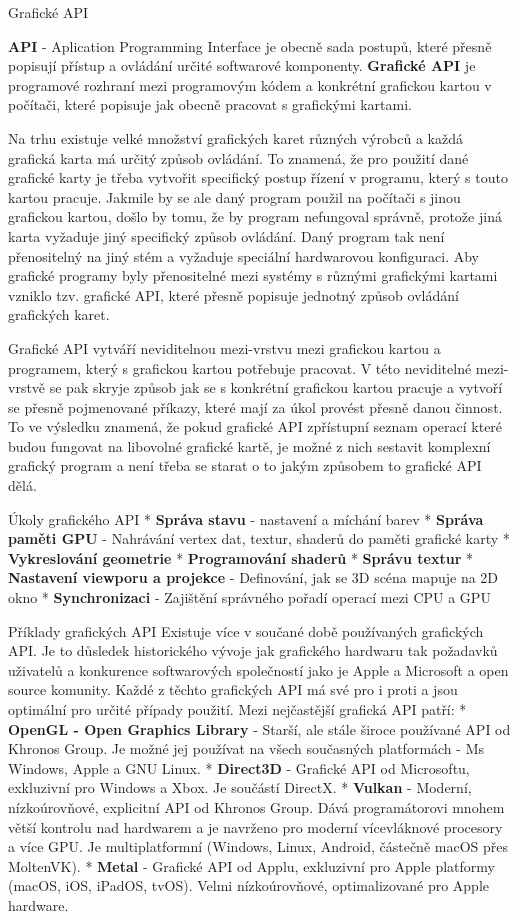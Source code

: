 \chap Grafické API

{\bf API} - Aplication Programming Interface je obecně sada postupů, které přesně popisují přístup a ovládání určité softwarové komponenty. {\bf Grafické API} je programové rozhraní mezi programovým kódem a konkrétní grafickou kartou v počítači, které popisuje jak obecně pracovat s grafickými kartami. 

Na trhu existuje velké množství grafických karet různých výrobců a každá grafická karta má určitý způsob ovládání. To znamená, že pro použití dané grafické karty je třeba vytvořit specifický postup řízení v programu, který s touto kartou pracuje. Jakmile by se ale daný program použil na počítači s jinou grafickou kartou, došlo by tomu, že by program nefungoval správně, protože jiná karta vyžaduje jiný specifický způsob ovládání. Daný program tak není přenositelný na jiný stém a vyžaduje speciální hardwarovou konfiguraci. Aby grafické programy byly přenositelné mezi systémy s různými grafickými kartami vzniklo tzv. grafické API, které přesně popisuje jednotný způsob ovládání grafických karet. 

Grafické API vytváří neviditelnou mezi-vrstvu mezi grafickou kartou a programem, který s grafickou kartou potřebuje pracovat. V této neviditelné mezi-vrstvě se pak skryje způsob jak se s konkrétní grafickou kartou pracuje a vytvoří se přesně pojmenované příkazy, které mají za úkol provést přesně danou činnost. To ve výsledku znamená, že pokud grafické API zpřístupní seznam operací které budou fungovat na libovolné grafické kartě, je možné z nich sestavit komplexní grafický program a není třeba se starat o to jakým způsobem to grafické API dělá.

\sec Úkoly grafického API
\begitems
* {\bf Správa stavu} - nastavení a míchání barev
* {\bf Správa paměti GPU} - Nahrávání vertex dat, textur, shaderů do paměti grafické karty
* {\bf Vykreslování geometrie}
* {\bf Programování shaderů} 
* {\bf Správu textur}
* {\bf Nastavení viewporu a projekce} - Definování, jak se 3D scéna mapuje na 2D okno
* {\bf Synchronizaci} - Zajištění správného pořadí operací mezi CPU a GPU
\enditems


\sec Příklady grafických API
Existuje více v součané době používaných grafických API. Je to důsledek historického vývoje jak grafického hardwaru tak požadavků uživatelů a konkurence softwarových společností jako je Apple a Microsoft a open source komunity. Každé z těchto grafických API má své pro i proti a jsou optimální pro určité případy použití. Mezi nejčastější grafická API patří:
\begitems
* {\bf OpenGL - Open Graphics Library} - Starší, ale stále široce používané API od Khronos Group. Je možné jej používat na všech současných platformách - Ms Windows, Apple a GNU Linux. 
* {\bf Direct3D} - Grafické API od Microsoftu, exkluzivní pro Windows a Xbox. Je součástí DirectX.
* {\bf Vulkan} - Moderní, nízkoúrovňové, explicitní API od Khronos Group. Dává programátorovi mnohem větší kontrolu nad hardwarem a je navrženo pro moderní vícevláknové procesory a více GPU. Je multiplatformní (Windows, Linux, Android, částečně macOS přes MoltenVK).
* {\bf Metal} - Grafické API od Applu, exkluzivní pro Apple platformy (macOS, iOS, iPadOS, tvOS). Velmi nízkoúrovňové, optimalizované pro Apple hardware.
\enditems

